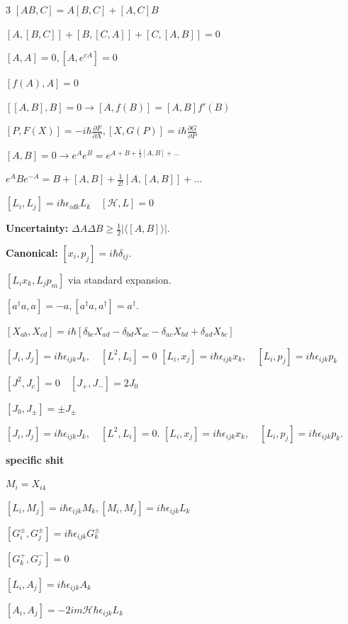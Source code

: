 \documentclass[10pt,a4paper]{article}
\begin{document}
\begin{multicols*}{3}
$[AB, C] = A[B, C] + [A, C]B$

$[A, [B, C]] + [B, [C, A]] + [C, [A, B]] = 0$

$[A,A] = 0, [A, e^{cA}] = 0$ 

$[f(A), A] = 0$ 

$[[A,B],B]=0\rightarrow[A, f(B)] = [A, B]f'(B)$

$[P, F(X)] = -i\hbar \frac{\partial F}{\partial X}, [X, G(P)] = i\hbar \frac{\partial G}{\partial P}$

$[A,B] = 0 \rightarrow  e^A e^B = e^{A+B+\frac{1}{2}[A,B] + \dots}$

$e^A B e^{-A} = B + [A,B] + \frac{1}{2!}[A,[A,B]] + \dots$

$[L_i,L_j] = i\hbar\epsilon_{idk}L_k \quad [\mathcal{H}, L] = 0 $

\textbf{Uncertainty:} $\Delta A \Delta B \ge \frac{1}{2}|\langle [A,B] \rangle|$.

\textbf{Canonical:} 
$[x_i, p_j] = i\hbar \delta_{ij}$.

$[L_i x_k, L_j p_m]$ via standard expansion.

$[a^\dagger a, a] = -a, [a^\dagger a, a^\dagger] = a^\dagger$.

$[X_{ab}, X_{cd}] = i \hbar[ \delta_{bc} X_{ad} - \delta_{bd} X_{ac} - \delta_{ac} X_{bd} + \delta_{ad} X_{bc}]$

$[J_i, J_j] = i\hbar \epsilon_{ijk} J_k, \quad [L^2, L_i] = 0$
$[L_i, x_j] = i\hbar \epsilon_{ijk} x_k, \quad [L_i, p_j] = i\hbar \epsilon_{ijk} p_k$

$[J^2,J_c]=0 \quad  [J_+,J_-]=2J_0$

$[J_0,J_\pm]=\pm J_\pm$

$[J_i, J_j] = i\hbar \epsilon_{ijk} J_k, \quad [L^2, L_i] = 0$.
$[L_i, x_j] = i\hbar \epsilon_{ijk} x_k, \quad [L_i, p_j] = i\hbar \epsilon_{ijk} p_k$.


\textbf{specific shit}

$M_i = X_{i4}$

$[L_i, M_j]=i\hbar\epsilon_{ijk}M_k, [M_i,M_j] = i\hbar\epsilon_{ijk}L_k$


$[G_i^\pm,G_j^\pm]=i\hbar\epsilon_{ijk}G_k^\pm $

$[G_k^+,G_j^-]=0$


$[L_i,A_j]=i\hbar\epsilon_{ijk}A_k$

$[A_i,A_j]=-2im\mathcal{H}\hbar\epsilon_{ijk}L_k$


\end{multicols*}
\end{document}

